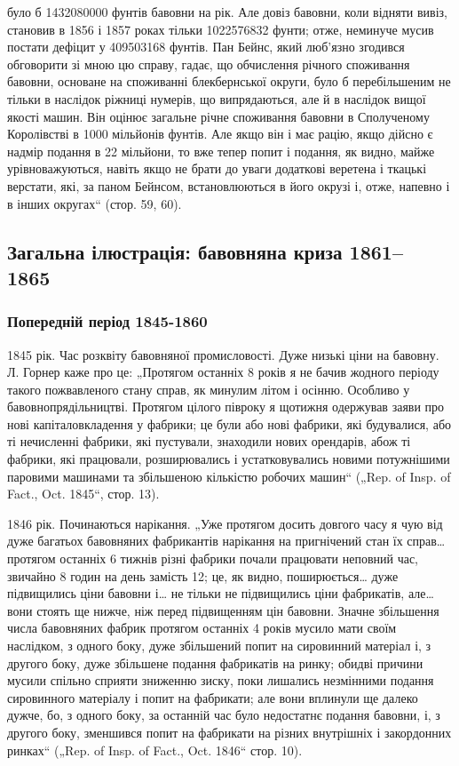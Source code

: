 \parcont{}  %
було б \num{1432080000} фунтів бавовни на рік. Але довіз бавовни,
коли відняти вивіз, становив в 1856 і 1857 роках тільки
\num{1022576832} фунти; отже, неминуче мусив постати дефіцит
у \num{409503168} фунтів. Пан Бейнс, який люб’язно згодився обговорити
зі мною цю справу, гадає, що обчислення річного споживання
бавовни, основане на споживанні блекбернської округи,
було б перебільшеним не тільки в наслідок ріжниці нумерів, що
випрядаються, але й в наслідок вищої якості машин. Він оцінює загальне
річне споживання бавовни в Сполученому Королівстві в
1000 мільйонів фунтів. Але якщо він і має рацію, якщо дійсно
є надмір подання в 22  мільйони, то вже тепер попит і подання,
як видно, майже урівноважуються, навіть якщо не брати до
уваги додаткові веретена і ткацькі верстати, які, за паном
Бейнсом, встановлюються в його окрузі і, отже, напевно і
в інших округах“ (стор. 59, 60).

\subsection{Загальна ілюстрація: бавовняна криза 1861--1865~}

\subsubsection{Попередній період 1845-1860~}

1845 рік. Час розквіту бавовняної промисловості. Дуже низькі
ціни на бавовну. Л. Горнер каже про це: „Протягом останніх
8 років я не бачив жодного періоду такого пожвавленого стану
справ, як минулим літом і осінню. Особливо у бавовнопрядільництві.
Протягом цілого півроку я щотижня одержував заяви
про нові капіталовкладення у фабрики; це були або нові фабрики,
які будувалися, або ті нечисленні фабрики, які пустували, знаходили
нових орендарів, абож ті фабрики, які працювали, розширювались
і устатковувались новими потужнішими паровими машинами
та збільшеною кількістю робочих машин“ („Rep. of Insp.
of Fact., Oct. 1845“, стор. 13).

1846 рік. Починаються нарікання. „Уже протягом досить довгого
часу я чую від дуже багатьох бавовняних фабрикантів нарікання
на пригнічений стан їх справ\dots{} протягом останніх 6 тижнів
різні фабрики почали працювати неповний час, звичайно
8 годин на день замість 12; це, як видно, поширюється\dots{} дуже
підвищились ціни бавовни і\dots{} не тільки не підвищились ціни
фабрикатів, але\dots{} вони стоять ще нижче, ніж перед підвищенням
цін бавовни. Значне збільшення числа бавовняних фабрик
протягом останніх 4 років мусило мати своїм наслідком,
з одного боку, дуже збільшений попит на сировинний матеріал
і, з другого боку, дуже збільшене подання фабрикатів на ринку;
обидві причини мусили спільно сприяти зниженню зиску, поки
лишались незмінними подання сировинного матеріалу і попит
на фабрикати; але вони вплинули ще далеко дужче, бо, з одного
боку, за останній час було недостатнє подання бавовни,
і, з другого боку, зменшився попит на фабрикати на різних
внутрішніх і закордонних ринках“ („Rep. of Insp. of Fact., Oct.
1846“ стор. 10).
